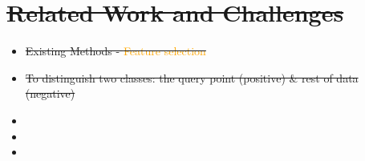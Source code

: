 \documentclass[
 size=14pt,
 paper=smartboard,  %
 mode=present, 		%
 display=slides, 	%
 style=tuliplab,  	%
 pauseslide,
 fleqn,leqno]{powerdot}
\providecommand{\DIFdeltex}[1]{{\protect\color{red}\sout{#1}}}                      %
\providecommand{\DIFdelbegin}{} %
\providecommand{\DIFdelend}{} %
\providecommand{\DIFdel}[1]{\texorpdfstring{\DIFdeltex{#1}}{}} %
\newcommand{\DIFscaledelfig}{0.5}
\newlength{\DIFdelgraphicswidth} %
\newlength{\DIFdelgraphicsheight} %
\newcommand{\DIFdelincludegraphics}[2][]{%
\sbox{\DIFdelgraphicsbox}{\DIFOincludegraphics[#1]{#2}}%
\settoboxwidth{\DIFdelgraphicswidth}{\DIFdelgraphicsbox} %
\settoboxtotalheight{\DIFdelgraphicsheight}{\DIFdelgraphicsbox} %
\scalebox{\DIFscaledelfig}{%
\parbox[b]{\DIFdelgraphicswidth}{\usebox{\DIFdelgraphicsbox}\\[-\baselineskip] \rule{\DIFdelgraphicswidth}{0em}}\llap{\resizebox{\DIFdelgraphicswidth}{\DIFdelgraphicsheight}{%
\setlength{\unitlength}{\DIFdelgraphicswidth}%
\begin{picture}(1,1)%
\thicklines\linethickness{2pt} %
{\color[rgb]{1,0,0}\put(0,0){\framebox(1,1){}}}%
{\color[rgb]{1,0,0}\put(0,0){\line( 1,1){1}}}%
{\color[rgb]{1,0,0}\put(0,1){\line(1,-1){1}}}%
\end{picture}%
}\hspace*{3pt}}} %
} %
\DeclareRobustCommand{\DIFdelbegin}{\DIFOdelbegin \let\includegraphics\DIFdelincludegraphics} %
\DeclareRobustCommand{\DIFdelend}{\DIFOaddend \let\includegraphics\DIFOincludegraphics} %
\begin{document}
\DIFdelbegin %

\section{\DIFdel{Related Work and Challenges}}
\addtocounter{section}{-1}%

\DIFdelend %
\DIFdelbegin %
\begin{itemize}%
\item%
\DIFdel{Existing Methods - \textcolor{orange}{Feature selection}
}%

\item%
\DIFdel{To distinguish two classes: the query point (positive) \& rest of data (negative)}
\end{itemize}%
\begin{itemize}%
\item%

\item%

\item%

\end{itemize}%
\end{document}
